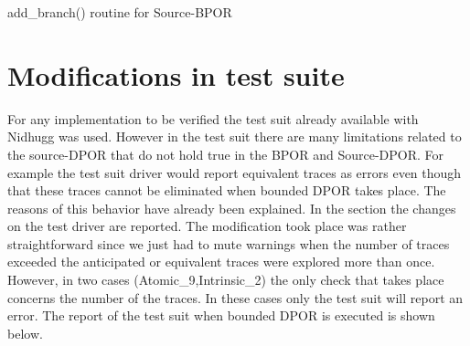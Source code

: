 \begin{algorithm}[H]
    \caption{add\_branch() routine for Source-BPOR}
    \label{addbranch routine for Source-BPOR}
\end{algorithm}

\section{Modifications in test suite}
For any implementation to be verified the test suit already available with Nidhugg was used. However in the test suit there are many limitations related to the source-DPOR
that do not hold true in the BPOR and Source-DPOR. For example the test suit driver would report equivalent traces as errors even though that these traces cannot be eliminated 
when bounded DPOR takes place. The reasons of this behavior have already been explained. In the section the changes on the test driver are reported.
The modification took place was rather straightforward since we just had to mute warnings when the number of traces exceeded the anticipated or equivalent traces were explored more than
once. However, in two cases (Atomic\_9,Intrinsic\_2) the only check that takes place concerns the number of the traces. In these cases only the test suit will report an error. 
The report of the test suit when bounded DPOR is executed is shown below.

